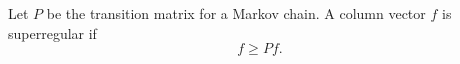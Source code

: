 Let $P$ be the transition matrix for a Markov chain. A column vector $f$ is superregular if
$$f \geq Pf.$$
